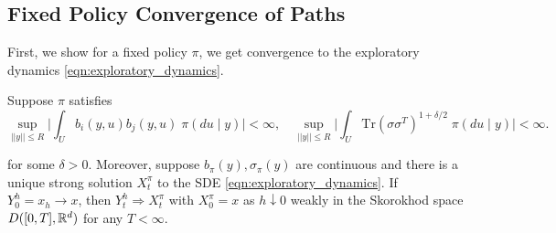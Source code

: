 \subsection{Fixed Policy Convergence of Paths}


First, we show for a fixed policy $\pi$, we get
convergence to the exploratory dynamics \eqref{eqn:exploratory_dynamics}.

\begin{lemma}
\label{lem:convergence_fixed_policy_to_exploratory_dynamics}
	Suppose $\pi$ satisfies
	\[\sup_{||y|| \leq R} \bigg| \int_U b_i(y, u) b_j(y,u) \; \pi(du \mid y) \bigg| < \infty, \quad \sup_{||y|| \leq R} \bigg|\int_U \mathrm{Tr}(\sigma\sigma^T)^{1+\delta/2} \; \pi(du \mid y) \bigg| < \infty.\]

	\noindent for some $\delta > 0$. Moreover, suppose $b_\pi(y), \sigma_\pi(y)$ are continuous
	 and there is a unique strong solution $X^\pi_t$ to the SDE
	\eqref{eqn:exploratory_dynamics}. If $Y^h_0 = x_h \to x$, then $Y^h_t \Rightarrow X^\pi_t$ with $X^\pi_0 = x$ as
	$h \downarrow 0$ weakly in the Skorokhod space $D([0,T], \mathbb{R}^d)$ for any $T < \infty$.

\end{lemma}

